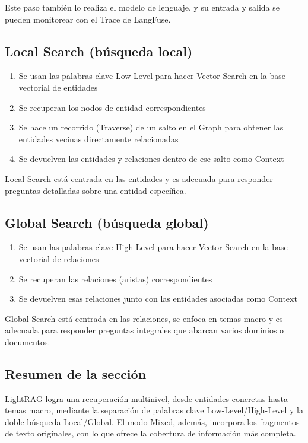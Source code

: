 \documentclass[a4paper]{article}
\begin{document}
Este paso también lo realiza el modelo de lenguaje, y su entrada y salida se pueden monitorear con el Trace de LangFuse.

\subsection{Local Search (búsqueda local)}

\begin{enumerate}
    \item Se usan las palabras clave Low-Level para hacer Vector Search en la base vectorial de entidades
    \item Se recuperan los nodos de entidad correspondientes
    \item Se hace un recorrido (Traverse) de un salto en el Graph para obtener las entidades vecinas directamente relacionadas
    \item Se devuelven las entidades y relaciones dentro de ese salto como Context
\end{enumerate}

Local Search está centrada en las entidades y es adecuada para responder preguntas detalladas sobre una entidad específica.

\subsection{Global Search (búsqueda global)}

\begin{enumerate}
    \item Se usan las palabras clave High-Level para hacer Vector Search en la base vectorial de relaciones
    \item Se recuperan las relaciones (aristas) correspondientes
    \item Se devuelven esas relaciones junto con las entidades asociadas como Context
\end{enumerate}

Global Search está centrada en las relaciones, se enfoca en temas macro y es adecuada para responder preguntas integrales que abarcan varios dominios o documentos.

\subsection{Resumen de la sección}

LightRAG logra una recuperación multinivel, desde entidades concretas hasta temas macro, mediante la separación de palabras clave Low-Level/High-Level y la doble búsqueda Local/Global. El modo Mixed, además, incorpora los fragmentos de texto originales, con lo que ofrece la cobertura de información más completa.
\end{document}
